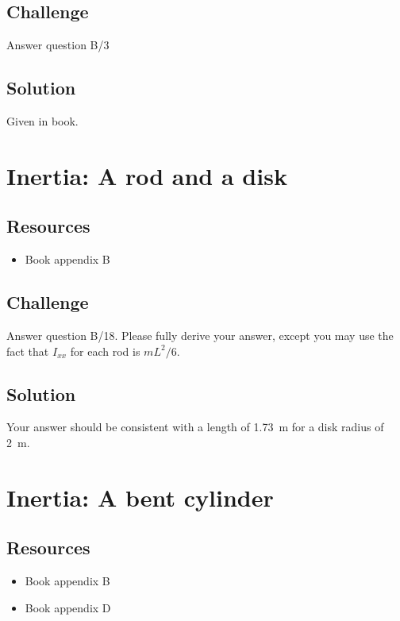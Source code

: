 \subsection*{Challenge}
Answer question B/3

\subsection*{Solution}
Given in book.




\newpage
\section{Inertia: A rod and a disk}

\subsection*{Resources}
\begin{itemize}
    \item Book appendix B
\end{itemize}

\subsection*{Challenge}
Answer question B/18. Please fully derive your answer, except you may use the fact that $I_{xx}$ for each rod is $m L^2/6$.

\subsection*{Solution}
Your answer should be consistent with a length of \SI{1.73}{\meter} for a disk radius of \SI{2}{\meter}.




\newpage
\section{Inertia: A bent cylinder}

\subsection*{Resources}
\begin{itemize}
    \item Book appendix B
    \item Book appendix D
\end{itemize}

